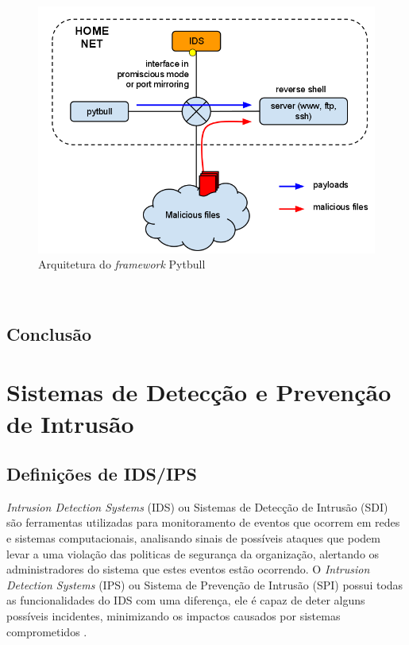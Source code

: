 \documentclass[
	12pt,				
	openright,		
	twoside,	
	a4paper,
	english,	
	brazil	
	]{abntex2}
\begin{document}
\begin{figure}
 \centering
 \includegraphics[scale=.4]{arquitetura_pytbull.png}
 \caption{Arquitetura do \textit{framework} Pytbull}
 \label{fig:pytbull}
\end{figure}

\
\section{Conclusão}
\chapter{Sistemas de Detecção e Prevenção de Intrusão}
\section{Definições de IDS/IPS}

\textit{Intrusion Detection Systems} (IDS) ou Sistemas de Detecção de Intrusão (SDI) são ferramentas utilizadas para monitoramento de eventos que ocorrem em redes e sistemas computacionais, analisando sinais de possíveis ataques que podem levar a uma violação das politicas de segurança da organização, alertando os administradores do sistema que estes eventos estão ocorrendo. O \textit{Intrusion Detection Systems} (IPS) ou Sistema de Prevenção de Intrusão (SPI) possui todas as funcionalidades do IDS com uma diferença, ele é capaz de deter alguns possíveis incidentes, minimizando os impactos causados por sistemas comprometidos \cite{mukhopadhyay01}.
\end{document}
